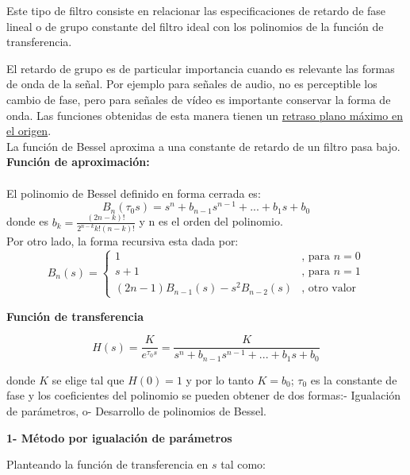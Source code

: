\documentclass[informe.tex]{subfiles}
\begin{document}
Este tipo de filtro consiste en relacionar las especificaciones de retardo de fase lineal o de grupo constante del filtro ideal con los polinomios de la función de transferencia.\newline

El retardo de grupo es de particular importancia cuando es relevante las formas de onda de la señal. Por ejemplo para señales de audio, no es perceptible los cambio de fase, pero para señales de vídeo es importante conservar la forma de onda.  Las funciones obtenidas de esta manera tienen un \underline{retraso plano máximo en el origen}.\\

La función de Bessel aproxima a una constante de retardo de un filtro pasa bajo.\\  

\textbf{Función de aproximación:}\\\\

El polinomio de Bessel definido en forma cerrada es:
		$$	
		B_n(\tau_0 s )=s^n + b_{n-1} s^{n-1} + ... + b_1 s + b_0
		$$
donde es $b_k = \frac{(2n - k)!}{2^{n-k} k! (n-k)!}$ y n es el orden del polinomio.\\

Por otro lado, la forma recursiva esta dada por:
	$$
	B_n(s) =
	\left \{ 
	    \begin{matrix}
		1                             		& \mbox{, para } n=0\\
     	s+1                           		& \mbox{, para } n=1\\
   		(2n-1) B_{n-1}(s)- s^2 B_{n-2}(s) & \mbox{, otro valor}
	    \end{matrix}
	\right.		
	$$    
		
	\textbf{Función de transferencia}

		\[	
			H(s) = \frac{K}{e^{\tau_0 s}} = \frac{K}{s^n + b_{n-1}s^{n-1} + ... + b_1 s + b_0}
		\]
	
 	donde $K$ se elige tal que $H(0)=1$ y por lo tanto $K=b_0$;  $\tau_0$ es la constante de fase y los coeficientes del polinomio se pueden obtener de dos formas:- Igualación de parámetros, o- Desarrollo de polinomios de Bessel.\newline
 	
\textbf{1- Método por igualación de parámetros}\newline

Planteando la función de transferencia en $s$ tal como: 	
		
\end{document}
